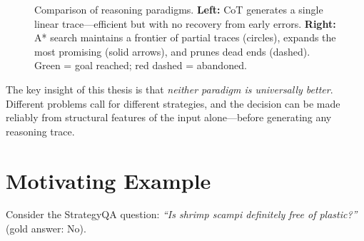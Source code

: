 \begin{figure}[htbp]
\caption{Comparison of reasoning paradigms. \textbf{Left:} CoT generates a single linear trace---efficient but with no recovery from early errors. \textbf{Right:} A* search maintains a frontier of partial traces (circles), expands the most promising (solid arrows), and prunes dead ends (dashed). Green = goal reached; red dashed = abandoned.}
\label{fig:paradigm_comparison}
\end{figure}

The key insight of this thesis is that \emph{neither paradigm is universally better}. Different problems call for different strategies, and the decision can be made reliably from structural features of the input alone---before generating any reasoning trace.

\section{Motivating Example}

Consider the StrategyQA question: \emph{``Is shrimp scampi definitely free of plastic?''} (gold answer: No).

